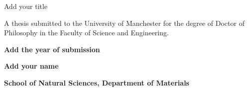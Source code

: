   



\thispagestyle{empty} 

\centering
\vspace{4.4 in}

\fontsize{24}{24}\selectfont 

Add your title

\fontsize{14}{14}\selectfont 
\vspace{1.4 in}
A thesis submitted to the University of Manchester for the degree of Doctor of Philosophy in the Faculty of Science and Engineering.


\vspace{1.4 in}
\textbf{Add the year of submission}


\vspace{1 in}
\noindent
\textbf{Add your name}


\vspace{1.2 in}
\textbf{School of Natural Sciences, Department of Materials}

\clearpage



